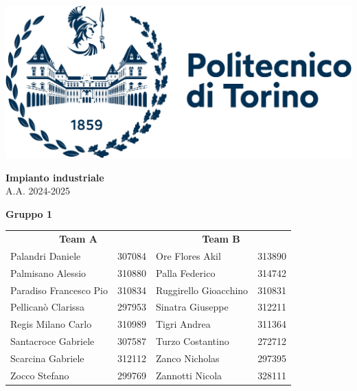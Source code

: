 \documentclass[11pt]{article}
\begin{document}
\thispagestyle{empty}

\begin{flushright}
    \includegraphics[width=0.4\linewidth]{images/Politecnico di Torino logo.pdf}
\end{flushright}

\vspace*{7cm}

\begin{flushleft}
    {\Huge\bfseries Impianto industriale} \\
    \vspace{1em}
    {\large A.A. 2024-2025} \\
    \vspace{4em}

    {\Large\bfseries Gruppo 1} \\
    \vspace{1em}
    \begin{tabular}{ll|ll}
        \multicolumn{2}{c|}{\textbf{Team A}} & \multicolumn{2}{c}{\textbf{Team B}} \\
        \large Palandri Daniele & \large 307084 & \large Ore Flores Akil & \large 313890 \\
        \large Palmisano Alessio & \large 310880 & \large Palla Federico & \large 314742 \\
        \large Paradiso Francesco Pio & \large 310834 & \large Ruggirello Gioacchino & \large 310831 \\
        \large Pellicanò Clarissa & \large 297953 & \large Sinatra Giuseppe & \large 312211 \\
        \large Regis Milano Carlo & \large 310989 & \large Tigri Andrea & \large 311364 \\
        \large Santacroce Gabriele & \large 307587 & \large Turzo Costantino & \large 272712 \\
        \large Scarcina Gabriele & \large 312112 & \large Zanco Nicholas & \large 297395 \\
        \large Zocco Stefano & \large 299769 & \large Zannotti Nicola & \large 328111 \\
    \end{tabular}

\end{flushleft}
\end{document}
